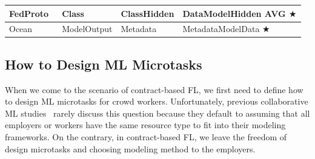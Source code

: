 \begin{table}[t]
\begin{tabular}{|l|p{2.6cm}|p{4cm}|p{5cm}|}
    FedProto~\cite{tan2022fedproto, michieli2021prototype} & \colorbox{Employer!30}{Class} & \colorbox{Employer!30}{Class}\colorbox{Worker!30}{Hidden} & \colorbox{Worker!30}{Data}\colorbox{Worker!30}{Model}\colorbox{Platform!30}{Hidden AVG} $\bigstar$ \\ \hline   

    Ocean~\cite{mcconaghy2022ocean} & \colorbox{Employer!30}{Model}\colorbox{Worker!30}{Output} & \colorbox{Worker!30}{Metadata} & \colorbox{Worker!30}{Metadata}\colorbox{Employer!30}{Model}\colorbox{Worker!30}{Data} $\bigstar$ \\ \hline

    \end{tabular}
    \vspace{-5mm}
\end{table}

\subsection{How to Design ML Microtasks}
\label{sec:how2design}
When we come to the scenario of contract-based FL, we first need to define how to design ML microtasks for crowd workers. 
Unfortunately, previous collaborative ML studies~\cite{li2021survey, nguyen2021federated} rarely discuss this question because they default to assuming that all employers or workers have the same resource type to fit into their modeling frameworks.
On the contrary, in contract-based FL, we leave the freedom of design microtasks and choosing modeling method to the employers.

